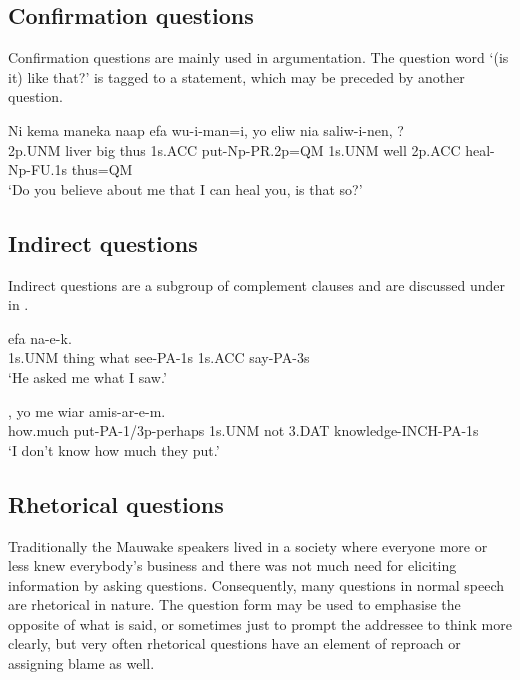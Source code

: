 \subsection{Confirmation questions}
\hypertarget{RefHeading22801935131865}{}
Confirmation questions are mainly used in argumentation. The question word   `(is it) like that?' is tagged to a statement, which may be preceded by another question. 

\ea%
\label{ex:x1188}
\gll Ni  kema  maneka  naap  efa  wu-i-man=i, yo  eliw  nia  saliw-i-nen,  ? \\
2p.UNM  liver  big  thus  1s.ACC  put-Np-PR.2p=QM  1s.UNM  well  2p.ACC  heal-Np-FU.1s  thus=QM    \\
\glt `Do you believe about me that I can heal you, is that so?'
\z









\subsection{Indirect questions}
\hypertarget{RefHeading22821935131865}{}
Indirect questions are a subgroup of complement clauses and are discussed under  in  .

\ea%
\label{ex:x1203}
  efa  na-e-k. \\
1s.UNM  thing  what  see-PA-1s  1s.ACC  say-PA-3s      \\
\glt `He asked me what I saw.'
\z





\ea%
\label{ex:x1204}
,  yo  me  wiar amis-ar-e-m. \\
how.much  put-PA-1/3p-perhaps  1s.UNM  not  3.DAT knowledge-INCH-PA-1s     \\
\glt `I don't know how much they put.'
\z




\subsection{Rhetorical questions}
\hypertarget{RefHeading22841935131865}{}
Traditionally the Mauwake speakers lived in a society where everyone more or less knew everybody's business and there was not much need for eliciting information by asking questions. Consequently, many questions in normal speech are rhetorical in nature. The question form may be used to emphasise the opposite of what is said, or sometimes just to prompt the addressee to think more clearly, but very often rhetorical questions have an element of reproach or assigning blame as well.

